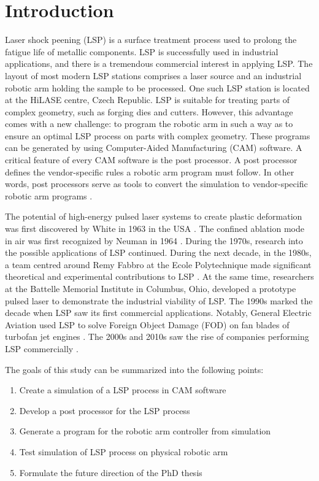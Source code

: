 \chapter{Introduction \label{ch:uvod}}




Laser shock peening (LSP) is a surface treatment process used to prolong the fatigue life of metallic components. LSP is successfully used in industrial applications, and there is a tremendous commercial interest in applying LSP. The layout of most modern LSP stations comprises a laser source and an industrial robotic arm holding the sample to be processed. One such LSP station is located at the HiLASE centre, Czech Republic. LSP is suitable for treating parts of complex geometry, such as forging dies and cutters. However, this advantage comes with a new challenge: to program the robotic arm in such a way as to ensure an optimal LSP process on parts with complex geometry. These programs can be generated by using Computer-Aided Manufacturing (CAM) software. A critical feature of every CAM software is the post processor. A post processor defines the vendor-specific rules a robotic arm program must follow.  In other words, post processors serve as tools to convert the simulation to vendor-specific robotic arm programs \cite{ding_ye_2006}.

The potential of high-energy pulsed laser systems to create plastic deformation was first discovered by White in 1963 in the USA \cite{white_1963}. The confined ablation mode in air was first recognized by Neuman in 1964 \cite{neuman_1964}. During the 1970s, research into the possible applications of LSP continued. During the next decade, in the 1980s, a team centred around Remy Fabbro at the Ecole Polytechnique made significant theoretical and experimental contributions to LSP \cite{fabbro_fournier_ballard_devaux_virmont_1990}. At the same time, researchers at the Battelle Memorial Institute in Columbus, Ohio, developed a prototype pulsed laser to demonstrate the industrial viability of LSP. The 1990s marked the decade when LSP saw its first commercial applications. Notably, General Electric Aviation used LSP to solve Foreign Object Damage (FOD) on fan blades of turbofan jet engines \cite{airforce}. The 2000s and 2010s saw the rise of companies performing LSP commercially \cite{sano}.

The goals of this study can be summarized into the following points:
\begin{enumerate}

    \item Create a simulation of a LSP process in CAM software
    \item Develop a post processor for the LSP process 
    \item Generate a program  for the robotic arm controller from simulation
    \item Test simulation of LSP process on physical robotic arm
    \item Formulate the future direction of the PhD thesis
    
\end{enumerate}

